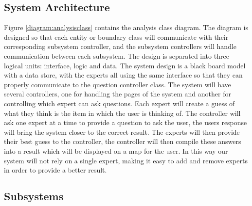 \documentclass[titlepage]{article}
\begin{document}
\subsection{System Architecture}

Figure \ref{diagram:analysisclass} contains the analysis class diagram. The diagram is designed so that each entity or boundary class will communicate with their corresponding subsystem controller, and the subsystem controllers will handle communication between each subsystem. The design is separated into three logical units: interface, logic and data. The system design is a black board model with a data store, with the experts all using the same interface so that they can properly communicate to the question controller class. The system will have several controllers, one for handling the pages of the system and another for controlling which expert can ask questions. Each expert will create a guess of what they think is the item in which the user is thinking of. The controller will ask one expert at a time to provide a question to ask the user, the users response will bring the system closer to the correct result. The experts will then provide their best guess to the controller, the controller will then compile these answers into a result which will be displayed on a map for the user. In this way our system will not rely on a single expert, making it easy to add and remove experts in order to provide a better result.

\subsection{Subsystems}
\label{sub:subsystems}
\end{document}
